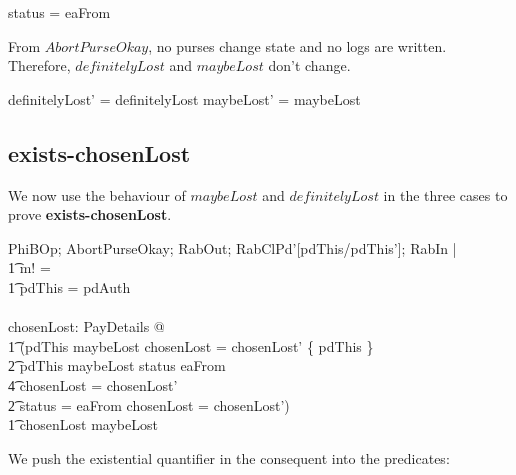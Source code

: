 \begin{gzed}
status = eaFrom
\end{gzed}

\noindent From $AbortPurseOkay$, no purses change state and no logs
are written. Therefore, $definitelyLost$ and $maybeLost$ don't
change.
\begin{gzed}
definitelyLost' = definitelyLost
\also %
maybeLost' = maybeLost
\end{gzed}

\subsection{exists-chosenLost}
\label{abort-exists-chosenlost}

We now use the behaviour of $maybeLost$ and $definitelyLost$ in the
three cases to prove {\bf exists-chosenLost}.

\begin{gzed}
  PhiBOp; AbortPurseOkay; RabOut; RabClPd'[pdThis/pdThis']; RabIn |
  \\ %
  \t1 m! = \bot
  \\ %
  \t1 \land pdThis = pdAuth
  \\ %
  \shows
  \\ %
  \exists  chosenLost: \power PayDetails @
  \\ %
  \t1 (pdThis \in maybeLost \land chosenLost = chosenLost' \cup \{
  pdThis \}
  \\ %
  \t2 \lor pdThis \notin maybeLost \land status \neq eaFrom
  \\ %
  \t4 \land chosenLost = chosenLost'
  \\ %
  \t2 \lor status = eaFrom \land chosenLost = chosenLost')
  \\ %
  \t1 \land chosenLost \subseteq maybeLost
\end{gzed}
We push the existential quantifier in the consequent into the
predicates:

